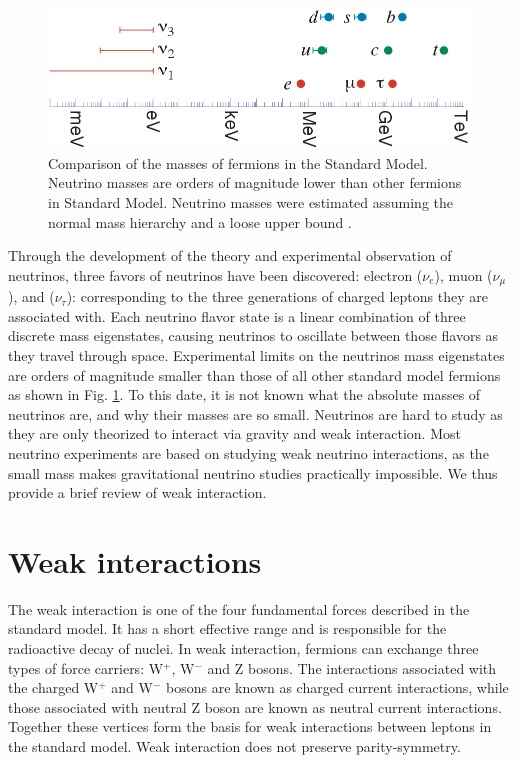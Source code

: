 \begin{figure}[!htb]
\centering
\includegraphics[width=0.85\linewidth]{ch1/figs/n_mass_comp.png}
\caption{Comparison of the masses of fermions in the Standard Model. Neutrino masses are orders of magnitude lower than other fermions in Standard Model. Neutrino masses were estimated assuming the normal mass hierarchy and a loose upper bound \cite{Hewett:2012ns}.}
\label{n_mass_comp}
\end{figure}

Through the development of the theory and experimental observation of neutrinos, three favors of neutrinos have been discovered: electron ($\nu_e$), muon ($\nu_{\mu}$), and ($\nu_{\tau}$): corresponding to the three generations of charged leptons they are associated with. Each neutrino flavor state is a linear combination of three discrete mass eigenstates, causing neutrinos to oscillate between those flavors as they travel through space. Experimental limits on the neutrinos mass eigenstates are orders of magnitude smaller than those of all other standard model fermions as shown in Fig. \ref{n_mass_comp}. To this date, it is not known what the absolute masses of neutrinos are, and why their masses are so small. Neutrinos are hard to study as they are only theorized to interact via gravity and weak interaction. Most neutrino experiments are based on studying weak neutrino interactions, as the small mass makes gravitational neutrino studies practically impossible. We thus provide a brief review of weak interaction.


\section{Weak interactions}
The weak interaction is one of the four fundamental forces described in the standard model. It has a short effective range and is responsible for the radioactive decay of nuclei. In weak interaction, fermions can exchange three types of force carriers: W$^+$, W$^-$ and Z bosons. The interactions associated with the charged W$^+$ and W$^-$ bosons are known as charged current interactions, while those associated with neutral Z boson are known as neutral current interactions.  Together these vertices form the basis for weak interactions between leptons in the standard model. Weak interaction does not preserve parity-symmetry.\cite{wu_experiment}


